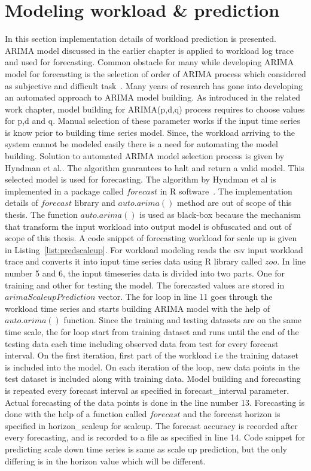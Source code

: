  \section{Modeling workload \& prediction}
\label{sec:implementationprediction}
In this section implementation details of workload prediction is presented. ARIMA model discussed in the earlier chapter is applied to workload log trace and used for forecasting. Common obstacle for many while developing ARIMA model for forecasting is the selection of order of ARIMA process which considered as subjective and difficult task~\cite{makridakis2008forecasting}. Many years of research has gone into developing an automated approach to ARIMA model building. As introduced in the related work chapter, model building for ARIMA(p,d,q) process requires to choose values for p,d and q. Manual selection of these parameter works if the input time series is know prior to building time series model. Since, the workload arriving to the system cannot be modeled easily there is a need for automating the model building. Solution to automated ARIMA model selection process is given by Hyndman et al.\cite{hyndman2007automatic}. The algorithm guarantees to halt and return a valid model\cite{hyndman2007automatic}. This selected model is used for forecasting. The algorithm by Hyndman et al\cite{hyndman2007automatic} is implemented in a package called \(forecast\) in R software~\cite{rstat}. The implementation details of \(forecast\) library  and \(auto.arima()\) method are out of scope of this thesis. The function \(auto.arima()\) is used as black-box because the mechanism that transform the input workload into output model is obfuscated and out of scope of this thesis. A code snippet of forecasting workload for scale up is given in Listing~\ref{list:predscaleup}. For workload modeling reads the csv input workload trace and converts it into input time series data using R library called \(zoo\). In line number 5 and 6, the input timeseries data is divided into two parts. One for training and other for testing the model. The forecasted values are stored in \(arimaScaleupPrediction\) vector. The for loop in line 11 goes through the workload time series and starts building ARIMA model with the help of \(auto.arima()\) function. Since the training and testing datasets are on the same time scale, the for loop start from training dataset and runs until the end of the testing data each time including observed data from test for every forecast interval. On the first iteration, first part of the workload i.e the training dataset is included into the model. On each iteration of the loop, new data points in the test dataset is included along with training data. Model building and forecasting is repeated every forecast interval as specified in forecast\_interval parameter. Actual forecasting of the data points is done in the line number 13. Forecasting is done with the help of a function called \(forecast\) and the forecast horizon is specified in horizon\_scaleup for scaleup. The forecast accuracy is recorded after every forecasting, and is recorded to a file as specified in line 14. Code snippet for predicting scale down time series is same as scale up prediction, but the only differing is in the horizon value which will be different.

